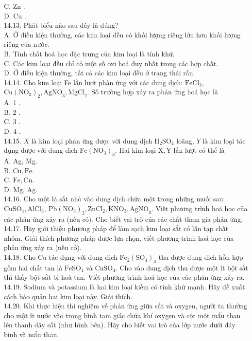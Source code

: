 \documentclass[10pt]{article}
\begin{document}
C. Zn .\\
D. Cu .\\
14.13. Phát biểu nào sau đây là đúng?\\
A. Ở điều kiện thường, các kim loại đều có khối lượng riêng lớn hơn khối lượng riêng của nước.\\
B. Tính chất hoá học đặc trưng của kim loại là tính khử.\\
C. Các kim loại đều chỉ có một số oxi hoá duy nhất trong các hợp chất.\\
D. Ở điều kiện thường, tất cả các kim loại đều ở trạng thái rắn.\\
14.14. Cho kim loại Fe lần lượt phản ứng với các dung dịch: $\mathrm{FeCl}_{3}$, $\mathrm{Cu}\left(\mathrm{NO}_{3}\right)_{2}, \mathrm{AgNO}_{3}, \mathrm{MgCl}_{2}$. Số trường hợp xảy ra phản ứng hoá học là\\
A. 1 .\\
B. 2 .\\
C. 3 .\\
D. 4 .\\
14.15. $X$ là kim loại phản ứng được với dung dịch $\mathrm{H}_{2} \mathrm{SO}_{4}$ loãng, $Y$ là kim loại tác dụng được với dung dịch $\mathrm{Fe}\left(\mathrm{NO}_{3}\right)_{3}$. Hai kim loại $\mathrm{X}, \mathrm{Y}$ lần lượt có thể là\\
A. Ag, Mg.\\
B. $\mathrm{Cu}, \mathrm{Fe}$.\\
C. $\mathrm{Fe}, \mathrm{Cu}$.\\
D. Mg, Ag.\\
14.16. Cho một lá sắt nhỏ vào dung dịch chứa một trong những muối sau: $\mathrm{CuSO}_{4}, \mathrm{AlCl}_{3}, \mathrm{~Pb}\left(\mathrm{NO}_{3}\right)_{2}, \mathrm{ZnCl}_{2}, \mathrm{KNO}_{3}, \mathrm{AgNO}_{3}$. Viết phương trình hoá học của các phản ứng xảy ra (nếu có). Cho biết vai trò của các chất tham gia phản ứng.\\
14.17. Hãy giới thiệu phương pháp để làm sạch kim loại sắt có lẫn tạp chất nhôm. Giải thích phương pháp được lựa chọn, viết phương trình hoá học của phản ứng xảy ra (nếu có).\\
14.18. Cho Cu tác dụng với dung dịch $\mathrm{Fe}_{2}\left(\mathrm{SO}_{4}\right)_{3}$ thu được dung dịch hỗn hợp gồm hai chất tan là $\mathrm{FeSO}_{4}$ và $\mathrm{CuSO}_{4}$. Cho vào dung dịch thu được một ît bột sắt thì thấy bột sắt bị hoà tan. Viết phương trình hoá học của các phản ứng xảy ra.\\
14.19. Sodium và potassium là hai kim loại kiềm có tính khử mạnh. Hãy đề xuất cách bảo quản hai kim loại này. Giải thích.\\
14.20. Khi thực hiện thí nghiệm về phản ứng giữa sắt và oxygen, người ta thường cho một ît nước vào trong bình tam giác chứa khí oxygen và cột một mẩu than lên thanh dây sắt (như hình bên). Hãy cho biết vai trò của lớp nước dưới đáy bình và mẩu than.
\end{document}
